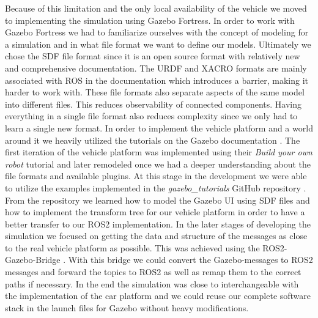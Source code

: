 Because of this limitation and the only local availability of the vehicle we moved to implementing the simulation using Gazebo Fortress. In order to work with Gazebo Fortress we had to familiarize ourselves with the concept of modeling for a simulation and in what file format we want to define our models. Ultimately we chose the SDF file format since it is an open source format with relatively new and comprehensive documentation. The URDF and XACRO formats are mainly associated with ROS in the documentation which introduces a barrier, making it harder to work with. These file formats also separate aspects of the same model into different files. This reduces observability of connected components. Having everything in a single file format also reduces complexity since we only had to learn a single new format. In order to implement the vehicle platform and a world around it we heavily utilized the tutorials on the Gazebo documentation \cite{gazebo-documentation}. The first iteration of the vehicle platform was implemented using their \textit{Build your own robot} tutorial and later remodeled once we had a deeper understanding about the file formats and available plugins. At this stage in the development we were able to utilize the examples implemented in the \textit{gazebo\_tutorials} GitHub repository \cite{gazebo-tutorials}. From the repository we learned how to model the Gazebo UI using SDF files and how to implement the transform tree for our vehicle platform in order to have a better transfer to our ROS2 implementation. In the later stages of developing the simulation we focused on getting the data and structure of the messages as close to the real vehicle platform as possible. This was achieved using the ROS2-Gazebo-Bridge \cite{ros-gz-bridge}. With this bridge we could convert the Gazebo-messages to ROS2 messages and forward the topics to ROS2 as well as remap them to the correct paths if necessary. In the end the simulation was close to interchangeable with the implementation of the car platform and we could reuse our complete software stack in the launch files for Gazebo without heavy modifications.

